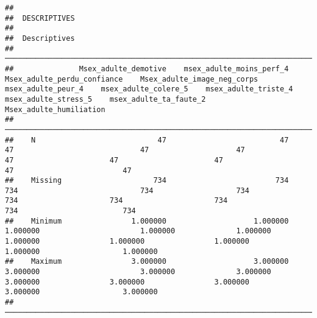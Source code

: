 \documentclass[
]{article}
\begin{document}
\begin{verbatim}
## 
##  DESCRIPTIVES
## 
##  Descriptives                                                                                                                                                                                                                                                                     
##  ──────────────────────────────────────────────────────────────────────────────────────────────────────────────────────────────────────────────────────────────────────────────────────────────────────────────────────────────────────────────────────────────────────────────── 
##               Msex_adulte_demotive    msex_adulte_moins_perf_4    Msex_adulte_perdu_confiance    Msex_adulte_image_neg_corps    msex_adulte_peur_4    msex_adulte_colere_5    msex_adulte_triste_4    msex_adulte_stress_5    msex_adulte_ta_faute_2    Msex_adulte_humiliation   
##  ──────────────────────────────────────────────────────────────────────────────────────────────────────────────────────────────────────────────────────────────────────────────────────────────────────────────────────────────────────────────────────────────────────────────── 
##    N                            47                          47                             47                             47                    47                      47                      47                      47                        47                         47   
##    Missing                     734                         734                            734                            734                   734                     734                     734                     734                       734                        734   
##    Minimum                1.000000                    1.000000                       1.000000                       1.000000              1.000000                1.000000                1.000000                1.000000                  1.000000                   1.000000   
##    Maximum                3.000000                    3.000000                       3.000000                       3.000000              3.000000                3.000000                3.000000                3.000000                  3.000000                   3.000000   
##  ────────────────────────────────────────────────────────────────────────────────────────────────────────────────────────────────────────────────────────────────────────────────────────────────────────────────────────────────────────────────────────────────────────────────
\end{verbatim}
\end{document}
